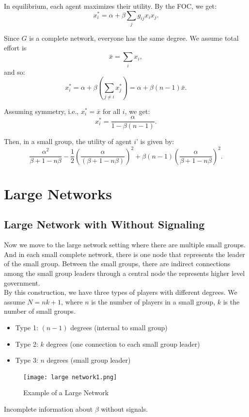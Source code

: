 \documentclass[12pt]{article}
\begin{document}
In equilibrium, each agent maximizes their utility. By the FOC, we get:
\[
x_i^* = \alpha + \beta \sum_j g_{ij}x_i x_j. \tag{2}
\]

Since $G$ is a complete network, everyone has the same degree. We assume total effort is  
\[
\bar{x} = \sum_i x_i,
\]
and so:
\[
x_i^* = \alpha + \beta \left( \sum_{j \neq i} x_j^* \right) = \alpha + \beta(n - 1)\bar{x}. \tag{3}
\]

Assuming symmetry, i.e., $x_i^* = \bar{x}$ for all $i$, we get:
\[
x_i^* = \frac{\alpha}{1 - \beta(n - 1)}.
\]

Then, in a small group, the utility of agent $i$' is given by:
\[
\frac{\alpha^2}{\beta + 1 - n\beta} - \frac{1}{2} \left( \frac{\alpha}{(\beta + 1 - n\beta)} \right)^2 + \beta(n - 1) \left( \frac{\alpha}{\beta + 1 - n\beta} \right)^2. \tag{4}
\]


\section{Large Networks}
\subsection{Large Network with Without Signaling}
Now we move to the large network setting where there are multiple small groups. And in each small complete network, there is one node that represents the leader of the small group. Between the small groups, there are indirect connections among the small group leaders through a central node the represents higher level government.\\
By this construction, we have three types of players with different degrees.  
We assume $N = nk + 1$, where $n$ is the number of players in a small group, $k$ is the number of small groups.

\begin{itemize}
    \item Type 1: $(n-1)$ degrees (internal to small group)
    \item Type 2: $k$ degrees (one connection to each small group leader)
    \item Type 3: $n$ degrees (small group leader)
\end{itemize}

\begin{figure}[H]
  \centering
  \texttt{[image: large network1.png]}
  \caption{Example of a Large Network}
  \label{fig:large-network}
\end{figure}
Incomplete information about $\beta$ without signals.
\end{document}
